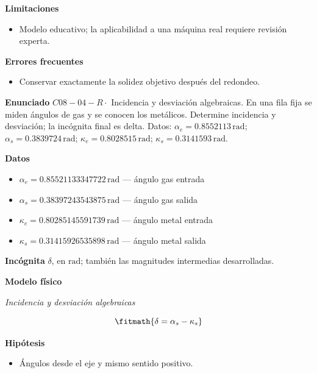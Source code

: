 \documentclass[10pt,openany]{book}
\begin{document}
\begin{tcolorbox}[title={Problema resuelto 3}, studiumworked, breakable]
\noindent\textbf{Limitaciones}
\begin{itemize}
\item Modelo educativo; la aplicabilidad a una máquina real requiere revisión experta.
\end{itemize}

\noindent\textbf{Errores frecuentes}
\begin{itemize}
\item Conservar exactamente la solidez objetivo después del redondeo.
\end{itemize}
\end{tcolorbox}

\begin{tcolorbox}[title={Problema resuelto 4}, studiumworked, breakable]

\noindent\textbf{Enunciado}
\(C08-04-R \cdot\) Incidencia y desviación algebraicas. En una fila fija se miden ángulos de gas y se conocen los metálicos. Determine incidencia y desviación; la incógnita final es delta. Datos: \(\alpha_e=0.8552113\, \mathrm{rad}\); \(\alpha_s=0.3839724\, \mathrm{rad}\); \(\kappa_e=0.8028515\, \mathrm{rad}\); \(\kappa_s=0.3141593\, \mathrm{rad}\).

\noindent\textbf{Datos}
\begin{itemize}
\item $\alpha_e = 0.85521133347722\,\mathrm{rad}$ — ángulo gas entrada
\item $\alpha_s = 0.38397243543875\,\mathrm{rad}$ — ángulo gas salida
\item $\kappa_e = 0.80285145591739\,\mathrm{rad}$ — ángulo metal entrada
\item $\kappa_s = 0.31415926535898\,\mathrm{rad}$ — ángulo metal salida
\end{itemize}

\noindent\textbf{Incógnita}
$\delta$, en $\mathrm{rad}$; también las magnitudes intermedias desarrolladas.

\noindent\textbf{Modelo físico}

\noindent\textit{Incidencia y desviación algebraicas}

\[
\fitmath{\delta=\alpha_s - \kappa_s}
\]

\noindent\textbf{Hipótesis}
\begin{itemize}
\item Ángulos desde el eje y mismo sentido positivo.
\end{itemize}


\end{tcolorbox}
\end{document}
